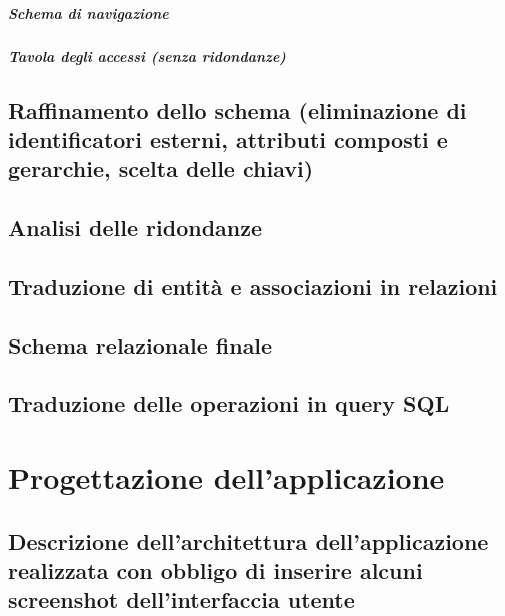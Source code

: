 \documentclass[a4paper,12pt]{report}
\begin{document}
\paragraph{Schema di navigazione} 
\paragraph{Tavola degli accessi (senza ridondanze)}

\section{Raffinamento dello schema (eliminazione di identificatori esterni, attributi composti e gerarchie, scelta delle chiavi)}
\section{Analisi delle ridondanze}
\section{Traduzione di entità e associazioni in relazioni}
\section{Schema relazionale finale}
\section{Traduzione delle operazioni in query SQL}
\chapter{Progettazione dell'applicazione}
\section{Descrizione dell'architettura dell'applicazione realizzata con obbligo di inserire alcuni screenshot dell'interfaccia utente}
\end{document}
